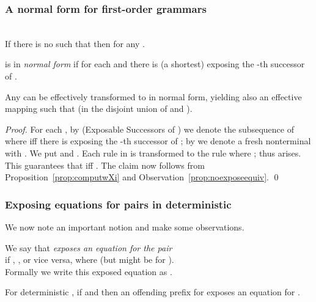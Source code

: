 \documentclass[12pt]{article}
\begin{document}
\subsubsection*{A normal form for first-order grammars}


\begin{observ}\label{prop:noexposeequiv}\hfill
\\
If there is no  such that  then 
 for any .
\end{observ}

\begin{defn}\label{def:grammarnormalform}
 is in \emph{normal form} 
if for each   and   there 
is (a shortest)  exposing the -th
successor of .
\end{defn}

\begin{prop}\label{prop:transinnormal}
Any  can be effectively transformed
to   in normal form, yielding also an
effective mapping 
such that
 (in the disjoint union of  and
). 
\end{prop}

\begin{proof}
For each , by  (Exposable
Successors of )
we denote the subsequence 
of  where  iff there is 
exposing the -th successor of ;
by  we denote a fresh nonterminal with
.
We put  and 
.
Each rule  in  is transformed to 
the rule 
where ; thus
 arises.
This guarantees that 
iff  .
The claim now follows from
Proposition~\ref{prop:computwXi} and
Observation~\ref{prop:noexposeequiv}.
\qed
\end{proof}


\subsubsection*
{Exposing equations for pairs  in deterministic }

We now note an important notion 
and make some 
observations.

\begin{defn}
We say that \mbox{} 
\emph{exposes an equation for 
the pair} 
\\
 
if 
, 
,
or vice versa, where  (but might be  for ).
\\
Formally we write this exposed equation 
as {\modr{}}.
\end{defn}

\begin{prop}\label{prop:exposing}
For deterministic ,
if 
and  
then
an offending prefix for   exposes an equation for .
\end{prop}
\end{document}
